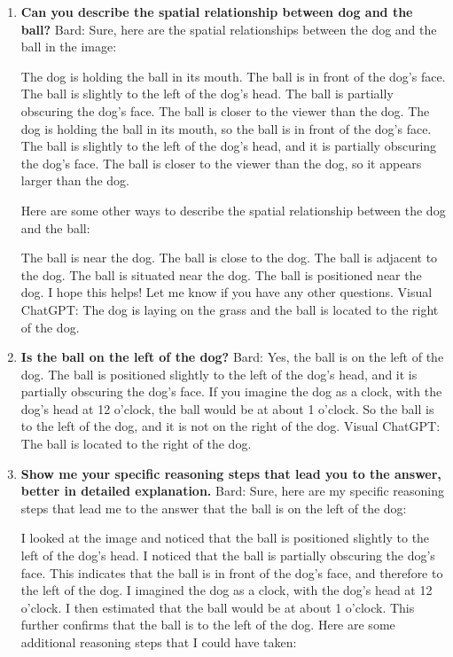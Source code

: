     \begin{enumerate}
        \item \textbf{Can you describe the spatial relationship between dog and the ball?}
        \subitem Bard: 
        Sure, here are the spatial relationships between the dog and the ball in the image:
        
        The dog is holding the ball in its mouth.
        The ball is in front of the dog's face.
        The ball is slightly to the left of the dog's head.
        The ball is partially obscuring the dog's face.
        The ball is closer to the viewer than the dog.
        The dog is holding the ball in its mouth, so the ball is in front of the dog's face. The ball is slightly to the left of the dog's head, and it is partially obscuring the dog's face. The ball is closer to the viewer than the dog, so it appears larger than the dog.
        
        Here are some other ways to describe the spatial relationship between the dog and the ball:
        
        The ball is near the dog.
        The ball is close to the dog.
        The ball is adjacent to the dog.
        The ball is situated near the dog.
        The ball is positioned near the dog.
        I hope this helps! Let me know if you have any other questions.
        \subitem Visual ChatGPT: The dog is laying on the grass and the ball is located to the right of the dog.
        \item \textbf{Is the ball on the left of the dog?}
        \subitem Bard: 
        Yes, the ball is on the left of the dog. The ball is positioned slightly to the left of the dog's head, and it is partially obscuring the dog's face. If you imagine the dog as a clock, with the dog's head at 12 o'clock, the ball would be at about 1 o'clock. So the ball is to the left of the dog, and it is not on the right of the dog.
        \subitem Visual ChatGPT: The ball is located to the right of the dog.
        \item \textbf{Show me your specific reasoning steps that lead you to the answer, better in detailed explanation.}
        \subitem Bard: 
        Sure, here are my specific reasoning steps that lead me to the answer that the ball is on the left of the dog:
        
        I looked at the image and noticed that the ball is positioned slightly to the left of the dog's head.
        I noticed that the ball is partially obscuring the dog's face. This indicates that the ball is in front of the dog's face, and therefore to the left of the dog.
        I imagined the dog as a clock, with the dog's head at 12 o'clock. I then estimated that the ball would be at about 1 o'clock. This further confirms that the ball is to the left of the dog.
        Here are some additional reasoning steps that I could have taken:
        

\end{enumerate}
